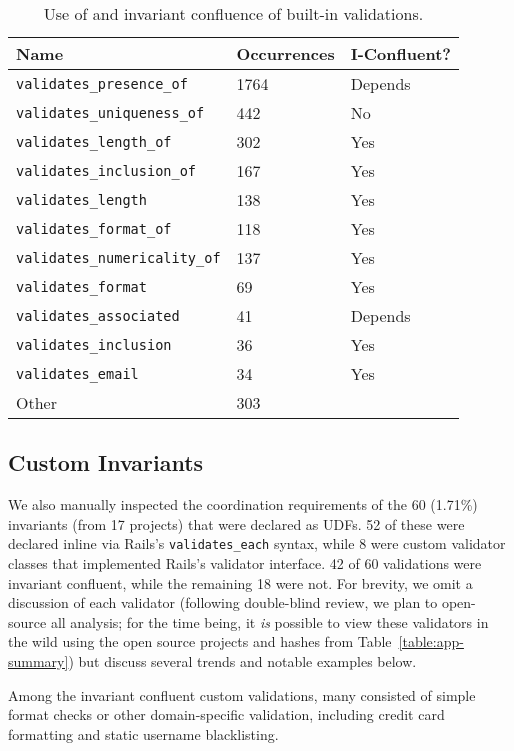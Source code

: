 \begin{table}
\begin{tabular}{|l l l |}
\hline
Name & Occurrences & I-Confluent?\\\hline
\texttt{validates\_presence\_of} & 1764 & Depends\\
\texttt{validates\_uniqueness\_of} & 442 & No \\
\texttt{validates\_length\_of} & 302 & Yes \\
\texttt{validates\_inclusion\_of} & 167 & Yes\\
\texttt{validates\_length} & 138 & Yes \\
\texttt{validates\_format\_of} & 118 & Yes\\
\texttt{validates\_numericality\_of} & 137 & Yes \\
\texttt{validates\_format} & 69 & Yes \\
\texttt{validates\_associated} & 41 & Depends\\
\texttt{validates\_inclusion} & 36 & Yes \\
\texttt{validates\_email} & 34 & Yes \\
Other & 303 & \\\hline
\end{tabular}
\caption{Use of and invariant confluence of built-in validations.}
\label{table:builtins}
\end{table}

\subsection{Custom Invariants}

We also manually inspected the coordination requirements of the 60
(1.71\%) invariants (from 17 projects) that were declared as UDFs. 52
of these were declared inline via Rails's \texttt{validates\_each}
syntax, while 8 were custom validator classes that implemented Rails's
validator interface. 42 of 60 validations were invariant confluent,
while the remaining 18 were not. For brevity, we omit a discussion of
each validator (following double-blind review, we plan to open-source
all analysis; for the time being, it \textit{is} possible to view
these validators in the wild using the open source projects and hashes
from Table~\ref{table:app-summary}) but discuss several trends and
notable examples below.

Among the invariant confluent custom validations, many consisted of
simple format checks or other domain-specific validation, including
credit card formatting and static username blacklisting.

